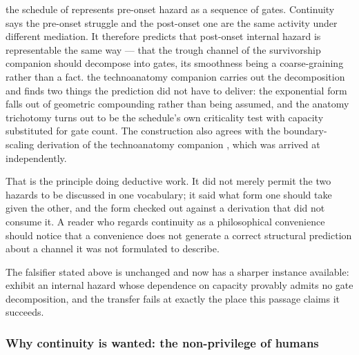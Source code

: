 the schedule of \cite{GoldenTechnoanatomy} represents pre-onset hazard as a sequence of
gates. Continuity says the pre-onset struggle and the post-onset one are
the same activity under different mediation. It therefore predicts that
post-onset internal hazard is representable the same way --- that the
trough channel of the survivorship companion \cite{GoldenSurvivorship} should decompose into gates, its
smoothness being a coarse-graining rather than a fact.
the technoanatomy companion \cite{GoldenTechnoanatomy} carries out the decomposition and
finds two things the prediction did not have to deliver: the exponential
form falls out of geometric compounding rather than being assumed, and
the anatomy trichotomy turns out to be the schedule's own criticality
test with capacity substituted for gate count. The construction also
agrees with the boundary-scaling derivation of
the technoanatomy companion \cite{GoldenTechnoanatomy}, which was arrived at independently.

That is the principle doing deductive work. It did not merely permit the
two hazards to be discussed in one vocabulary; it said what form one
should take given the other, and the form checked out against a
derivation that did not consume it. A reader who regards continuity as a
philosophical convenience should notice that a convenience does not
generate a correct structural prediction about a channel it was not
formulated to describe.

The falsifier stated above is unchanged and now has a sharper instance
available: exhibit an internal hazard whose dependence on capacity
provably admits no gate decomposition, and the transfer fails at exactly
the place this passage claims it succeeds.

\subsubsection{Why continuity is wanted: the non-privilege of humans}
\label{gc:subsub:nonprivilege}

